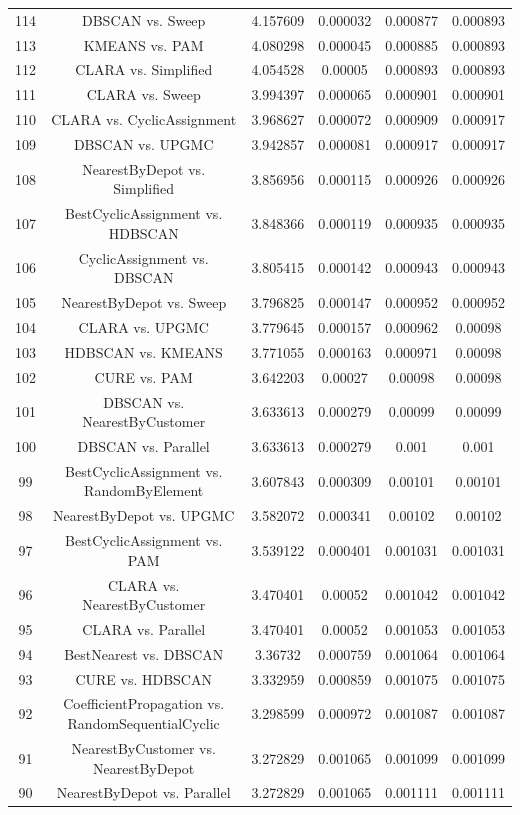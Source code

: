 \documentclass[a4paper,10pt]{article}
\begin{document}
\begin{landscape}
\begin{table}[!htp]
\begin{tabular}{cccccc}
114&DBSCAN vs. Sweep&4.157609&0.000032&0.000877&0.000893\\
113&KMEANS vs. PAM&4.080298&0.000045&0.000885&0.000893\\
112&CLARA vs. Simplified&4.054528&0.00005&0.000893&0.000893\\
111&CLARA vs. Sweep&3.994397&0.000065&0.000901&0.000901\\
110&CLARA vs. CyclicAssignment&3.968627&0.000072&0.000909&0.000917\\
109&DBSCAN vs. UPGMC&3.942857&0.000081&0.000917&0.000917\\
108&NearestByDepot vs. Simplified&3.856956&0.000115&0.000926&0.000926\\
107&BestCyclicAssignment vs. HDBSCAN&3.848366&0.000119&0.000935&0.000935\\
106&CyclicAssignment vs. DBSCAN&3.805415&0.000142&0.000943&0.000943\\
105&NearestByDepot vs. Sweep&3.796825&0.000147&0.000952&0.000952\\
104&CLARA vs. UPGMC&3.779645&0.000157&0.000962&0.00098\\
103&HDBSCAN vs. KMEANS&3.771055&0.000163&0.000971&0.00098\\
102&CURE vs. PAM&3.642203&0.00027&0.00098&0.00098\\
101&DBSCAN vs. NearestByCustomer&3.633613&0.000279&0.00099&0.00099\\
100&DBSCAN vs. Parallel&3.633613&0.000279&0.001&0.001\\
99&BestCyclicAssignment vs. RandomByElement&3.607843&0.000309&0.00101&0.00101\\
98&NearestByDepot vs. UPGMC&3.582072&0.000341&0.00102&0.00102\\
97&BestCyclicAssignment vs. PAM&3.539122&0.000401&0.001031&0.001031\\
96&CLARA vs. NearestByCustomer&3.470401&0.00052&0.001042&0.001042\\
95&CLARA vs. Parallel&3.470401&0.00052&0.001053&0.001053\\
94&BestNearest vs. DBSCAN&3.36732&0.000759&0.001064&0.001064\\
93&CURE vs. HDBSCAN&3.332959&0.000859&0.001075&0.001075\\
92&CoefficientPropagation vs. RandomSequentialCyclic&3.298599&0.000972&0.001087&0.001087\\
91&NearestByCustomer vs. NearestByDepot&3.272829&0.001065&0.001099&0.001099\\
90&NearestByDepot vs. Parallel&3.272829&0.001065&0.001111&0.001111\\

\end{tabular}
\end{table}
\end{landscape}
\end{document}
